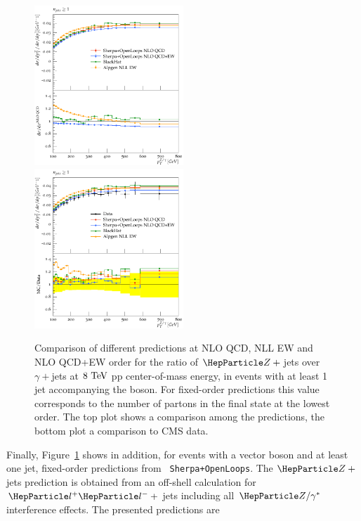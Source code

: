 \documentclass[11pt]{cernrep}
\begin{document}
\begin{figure}
\begin{center}
\includegraphics[width=0.5\textwidth]{d07-x01-y01-SherpaOL-mc.pdf} \\
\includegraphics[width=0.5\textwidth]{d07-x01-y01-SherpaOL.pdf} \\
 \caption{Comparison of different predictions at NLO QCD,  NLL EW and
   NLO QCD+EW order for the  
   ratio of $\PZ+{}$jets over $\gamma+{}$jets at $8~\text{TeV}$ pp
   center-of-mass energy, in events with at least 1 jet accompanying
   the boson. For fixed-order predictions this value corresponds to
   the number of partons in the final state at the lowest order. The
   top plot shows a comparison among the predictions, the bottom plot
   a comparison to CMS data. }
\label{zgrNLO}
\end{center}
\end{figure}
%
Finally, Figure~\ref{zgrNLO} shows in addition, for events with a
vector boson and at least one jet, fixed-order predictions from {\tt
  Sherpa+OpenLoops}. The $\PZ+{}$jets prediction is obtained from an
off-shell calculation for $\Pl^+\Pl^-+{}$jets including all
$\PZ/\gamma^*$ interference effects.  The presented predictions are
\end{document}
